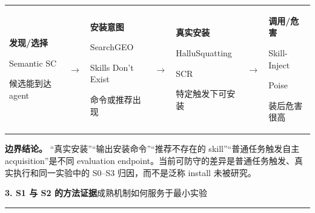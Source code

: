 \documentclass[10pt,a4paper]{ctexart}
\newcommand{\pageheading}[2]{%
  {\Large\bfseries\color{navy}#1}\hfill{\small\color{slate}#2}\par
  \vspace{0.15cm}\color{line}\hrule\color{black}\vspace{0.30cm}
}
\begin{document}
\vspace{0.30cm}
\begin{tabularx}{\textwidth}{Y C{0.55cm}Y C{0.55cm}Y C{0.55cm}Y}
\begin{linkbox}[height=2.7cm,valign=center]\centering\textbf{发现/选择}\par Semantic SC\par 候选能到达 agent\end{linkbox}
& $\rightarrow$ &
\begin{linkbox}[height=2.7cm,valign=center]\centering\textbf{安装意图}\par SearchGEO\par Skills Don't Exist\par 命令或推荐出现\end{linkbox}
& $\rightarrow$ &
\begin{linkbox}[height=2.7cm,valign=center]\centering\textbf{真实安装}\par HalluSquatting\par SCR\par 特定触发下可安装\end{linkbox}
& $\rightarrow$ &
\begin{linkbox}[height=2.7cm,valign=center]\centering\textbf{调用/危害}\par Skill-Inject\par Poise\par 装后危害很高\end{linkbox}
\end{tabularx}

\begin{warnbox}
\textbf{边界结论。} “真实安装”“输出安装命令”“推荐不存在的 skill”“普通任务触发自主 acquisition”是不同 evaluation endpoint。当前可防守的差异是普通任务触发、真实执行和同一实验中的 S0--S3 归因，而不是泛称 install 未被研究。
\end{warnbox}

\newpage

\pageheading{3. S1 与 S2 的方法证据}{成熟机制如何服务于最小实验}
\end{document}
